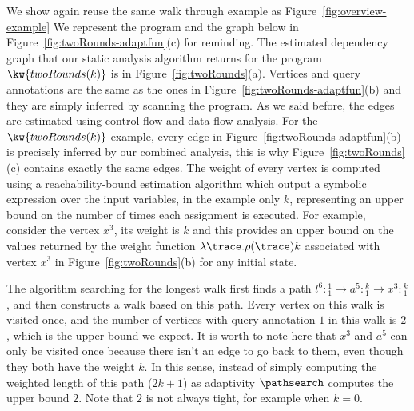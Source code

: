 \begin{example}[twoRounds]    
    We show again reuse the same walk through example as Figure~\ref{fig:overview-example}
    We represent the program and the graph below in Figure~\ref{fig:twoRounds-adaptfun}(c) for reminding.
    The estimated dependency graph that our static analysis algorithm returns for the program $\kw{twoRounds(k)}$ is in Figure~\ref{fig:twoRounds}(a).
    Vertices and query annotations are the same as the ones in Figure~\ref{fig:twoRounds-adaptfun}(b) and they are simply inferred by scanning the program.
    As we said before, the edges are estimated using control flow and data flow analysis.
    For the $\kw{twoRounds(k)}$ example, every edge in Figure~\ref{fig:twoRounds-adaptfun}(b) is precisely inferred by our combined analysis, this is why Figure~\ref{fig:twoRounds}(c) contains exactly the same edges.
    The weight of every vertex is computed using a reachability-bound estimation algorithm which output a symbolic expression over the input variables, in the example only $k$, representing an upper bound on the number of times each assignment is executed.
    For example, consider the vertex $x^{3}$, its weight is $k$ and this provides an upper bound on the values returned by the weight function $\lambda \trace. \rho(\trace)k$ associated with vertex $x^{3}$ in Figure~\ref{fig:twoRounds}(b) for any initial state. 
    
    The algorithm searching for the longest walk first finds a path $l^6:{}^1_1 \to a^5: {}^k_1 \to x^3: {}^k_1$, and then constructs a walk based on this path. Every vertex on this walk is visited once, and the number of vertices with query annotation $1$ in this walk is $2$, which is the upper bound we expect.
    {It is worth to note here that $x^3$ and $a^5$ can only be visited once because there isn't an edge to go back to them, even though they both have the weight $k$}.
    In this sense, instead of simply computing the weighted length of this path ($2k+1$) as adaptivity $\pathsearch$ computes the upper bound $2$. Note that $2$ is not always tight, for example when $k = 0$.
    

\end{example}
